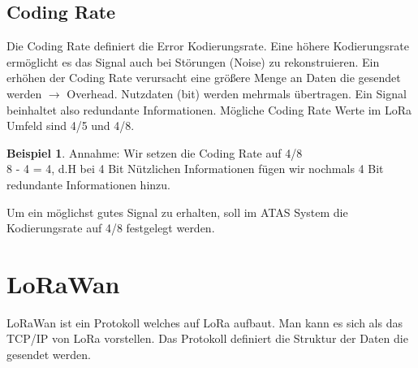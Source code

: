 \documentclass[11pt,english,german]{report}
\theoremstyle{definition}
\newtheorem{exmp}{Beispiel}[subsection]
\begin{document}
\newpage
\subsection{Coding Rate}
Die Coding Rate definiert die Error Kodierungsrate. Eine höhere Kodierungsrate ermöglicht es das Signal auch bei Störungen (Noise) zu rekonstruieren. Ein erhöhen der Coding Rate verursacht eine größere Menge an Daten die gesendet werden $\rightarrow$ Overhead. Nutzdaten (bit) werden mehrmals übertragen. Ein Signal beinhaltet also redundante Informationen. Mögliche Coding Rate Werte im LoRa Umfeld sind 4/5 und 4/8.
\begin{exmp}
	Annahme: Wir setzen die Coding Rate auf 4/8\\
	8 - 4 = 4, d.H bei 4 Bit Nützlichen Informationen fügen wir nochmals 4 Bit redundante Informationen hinzu.
\end{exmp}
\noindent
Um ein möglichst gutes Signal zu erhalten, soll im ATAS System die Kodierungsrate auf 4/8 festgelegt werden.


\newpage
\section{LoRaWan}
LoRaWan ist ein Protokoll welches auf LoRa aufbaut. Man kann es sich als das TCP/IP von LoRa vorstellen. Das Protokoll definiert die Struktur der Daten die gesendet werden.
\end{document}
